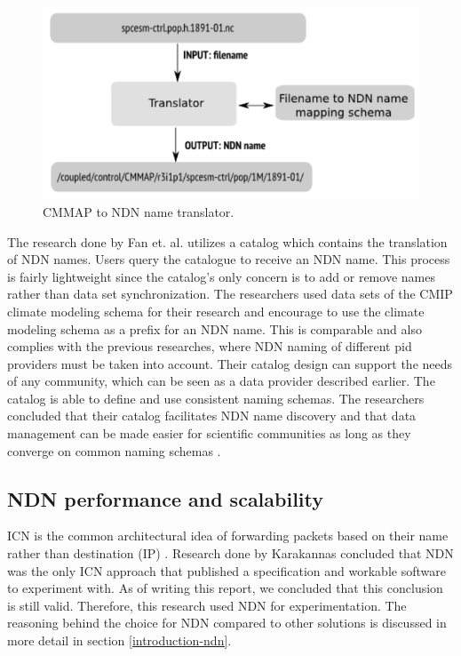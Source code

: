 \begin{figure}[H]
\centering
\includegraphics[scale=0.4]{Images/cmip2ndn.png}
\caption{CMMAP to NDN name translator.}
\label{fig:cmmap_ndnn}
\end{figure}

The research done by Fan et. al. utilizes a catalog which contains the translation of NDN names. Users query the catalogue to receive an NDN name. This process is fairly lightweight since the catalog's only concern is to add or remove names rather than data set synchronization. The researchers used data sets of the CMIP climate modeling schema for their research and encourage to use the climate modeling schema as a prefix for an NDN name. This is comparable and also complies with the previous researches, where NDN naming of different \gls{pid} providers must be taken into account.
Their catalog design can support the needs of any community, which can be seen as a data provider described earlier. The catalog is able to define and use consistent naming schemas.
The researchers concluded that their catalog facilitates NDN name discovery and that data management can be made easier for scientific communities as long as they converge on common naming schemas \cite{ndn-man}. 

\subsection{NDN performance and scalability}
\label{introduction-related-work-ndn}
ICN is the common architectural idea of forwarding packets based on their name rather than destination (IP) \cite{jacobson2009networking}. Research done by Karakannas \cite{icn-bd} concluded that NDN was the only ICN approach that published a specification and workable software to experiment with. As of writing this report, we concluded that this conclusion is still valid. Therefore, this research used NDN for experimentation. The reasoning behind the choice for NDN compared to other solutions is discussed in more detail in section \ref{introduction-ndn}.

